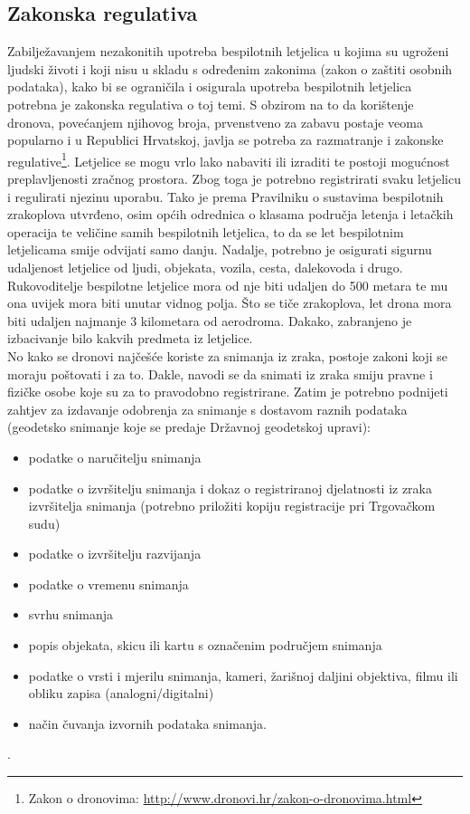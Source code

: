 \documentclass[times, utf8, diplomski]{fer}
\begin{document}
\subsection{Zakonska regulativa\citep{Ekscentar}} 
Zabilježavanjem nezakonitih upotreba bespilotnih letjelica u kojima su ugroženi ljudski životi i koji nisu u skladu s određenim zakonima (zakon o zaštiti osobnih podataka), kako bi se ograničila i osigurala upotreba bespilotnih letjelica potrebna je zakonska regulativa o toj temi. S obzirom na to da korištenje dronova, povećanjem njihovog broja, prvenstveno za zabavu postaje veoma popularno i u Republici Hrvatskoj, javlja se potreba za razmatranje i zakonske regulative\footnote{Zakon o dronovima: \url{http://www.dronovi.hr/zakon-o-dronovima.html}}.  Letjelice  se  mogu  vrlo  lako  nabaviti  ili  izraditi  te  postoji mogućnost preplavljenosti zračnog prostora. Zbog toga je potrebno registrirati svaku letjelicu i regulirati njezinu uporabu. Tako je prema Pravilniku o sustavima bespilotnih zrakoplova utvrđeno, osim općih odrednica o klasama područja letenja i letačkih operacija te veličine samih bespilotnih letjelica, to da se let bespilotnim letjelicama smije odvijati samo danju. Nadalje, potrebno je osigurati sigurnu udaljenost letjelice od ljudi, objekata, vozila, cesta, dalekovoda i drugo. Rukovoditelje bespilotne letjelice mora od nje biti udaljen do 500 metara te mu ona uvijek mora biti unutar vidnog polja. Što se tiče zrakoplova, let  drona  mora  biti  udaljen  najmanje  3  kilometara  od  aerodroma.  Dakako,  zabranjeno  je izbacivanje bilo kakvih predmeta iz letjelice. \\
No kako se dronovi najčešće koriste za snimanja iz zraka, postoje zakoni koji se moraju poštovati i za to. Dakle, navodi se da snimati iz zraka smiju pravne i fizičke osobe koje su za to pravodobno registrirane. Zatim je potrebno podnijeti zahtjev za izdavanje odobrenja za snimanje s dostavom  raznih  podataka (geodetsko snimanje koje se predaje Državnoj geodetskoj upravi):
\begin{itemize}
\item podatke o naručitelju snimanja
\item podatke o izvršitelju snimanja i dokaz o registriranoj djelatnosti iz zraka izvršitelja snimanja (potrebno priložiti kopiju registracije pri Trgovačkom sudu)
\item podatke o izvršitelju razvijanja
\item podatke o vremenu snimanja
\item svrhu snimanja
\item popis objekata, skicu ili kartu s označenim područjem snimanja
\item podatke o vrsti i mjerilu snimanja, kameri, žarišnoj daljini objektiva, filmu ili obliku zapisa (analogni/digitalni)
\item način čuvanja izvornih podataka snimanja.
\end{itemize}.
\end{document}
